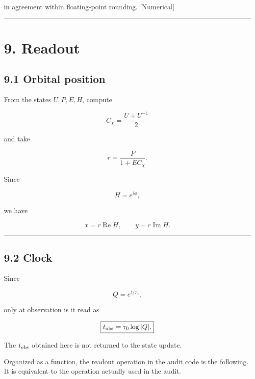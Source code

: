 \documentclass[
  a4paper,
]{article}
\begin{document}
in agreement within floating-point rounding. {[}Numerical{]}

\begin{center}\rule{0.5\linewidth}{0.5pt}\end{center}

\section{9. Readout}\label{readout}

\subsection{9.1 Orbital position}\label{orbital-position}

From the states \(U,P,E,H\), compute

\[
C_\chi=\frac{U+U^{-1}}2
\]

and take

\[
\boxed{
r=\frac{P}{1+EC_\chi}.
}
\]

Since

\[
H=e^{i\phi},
\]

we have

\[
\boxed{
x=r\operatorname{Re}H,
\qquad
y=r\operatorname{Im}H.
}
\]

\begin{center}\rule{0.5\linewidth}{0.5pt}\end{center}

\subsection{9.2 Clock}\label{clock}

Since

\[
Q=e^{t/\tau_0},
\]

only at observation is it read as

\[
\boxed{
t_{\rm obs}
=\tau_0\log |Q|.
}
\]

The \(t_{\rm obs}\) obtained here is not returned to the state update.

Organized as a function, the readout operation in the audit code is the
following. It is equivalent to the operation actually used in the audit.
\end{document}
